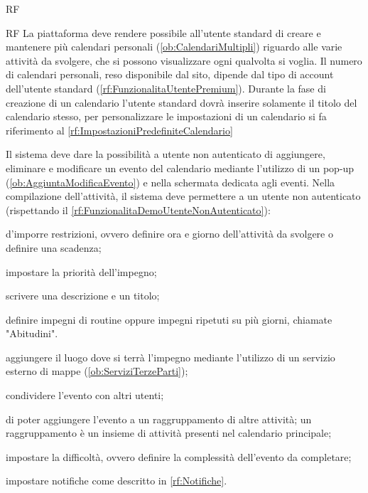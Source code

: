 \begin{listaPersonale}{RF}
\begin{listaPersonale2}{RF}
		 La piattaforma deve rendere possibile all'utente standard di creare e mantenere più calendari personali (\ref{ob:CalendariMultipli}) riguardo alle varie attività da svolgere, che si possono visualizzare ogni qualvolta si voglia. Il numero di calendari personali, reso disponibile dal sito, dipende dal tipo di account dell'utente standard (\ref{rf:FunzionalitaUtentePremium}). Durante la fase di creazione di un calendario l'utente standard dovrà inserire solamente il titolo del calendario stesso, per personalizzare le impostazioni di un calendario si fa riferimento al \ref{rf:ImpostazioniPredefiniteCalendario}
	\end{listaPersonale2}

	 Il sistema deve dare la possibilità a utente non autenticato di aggiungere, eliminare e modificare un evento del calendario mediante l'utilizzo di un pop-up (\ref{ob:AggiuntaModificaEvento}) e nella schermata dedicata agli eventi. Nella compilazione dell'attività, il sistema deve permettere a un utente non autenticato (rispettando il \ref{rf:FunzionalitaDemoUtenteNonAutenticato}):
	\begin{listaPersonale2}[RF]{}
		 d'imporre restrizioni, ovvero definire ora e giorno dell'attività da svolgere o definire una scadenza;

		 impostare la priorità dell'impegno;

		 scrivere una descrizione e un titolo;

		 definire impegni di routine oppure impegni ripetuti su più giorni, chiamate "Abitudini".

		 aggiungere il luogo dove si terrà l'impegno mediante l'utilizzo di un servizio esterno di mappe (\ref{ob:ServiziTerzeParti});

		 condividere l'evento con altri utenti;

		 di poter aggiungere l'evento a un raggruppamento di altre attività; un raggruppamento è un insieme di attività presenti nel calendario principale;

		 impostare la difficoltà, ovvero definire la complessità dell'evento da completare;

		 impostare notifiche come descritto in \ref{rf:Notifiche}.


\end{listaPersonale2}
\end{listaPersonale}
